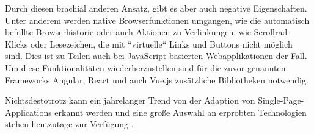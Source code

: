 Durch diesen brachial anderen Ansatz, gibt es aber auch negative Eigenschaften. Unter anderem werden native Browserfunktionen umgangen, wie die automatisch befüllte Browserhistorie oder auch Aktionen zu Verlinkungen, wie Scrollrad-Klicks oder Lesezeichen, die mit ``virtuelle`` Links und Buttons nicht möglich sind. Dies ist zu Teilen auch bei JavaScript-basierten Webapplikationen der Fall. Um diese Funktionalitäten wiederherzustellen sind für die zuvor genannten Frameworks Angular, React und auch Vue.js zusätzliche Bibliotheken notwendig.

Nichtsdestotrotz kann ein jahrelanger Trend von der Adaption von Single-Page-Applications erkannt werden und eine große Auswahl an erprobten Technologien stehen heutzutage zur Verfügung \cite{StateofJS2019}.


